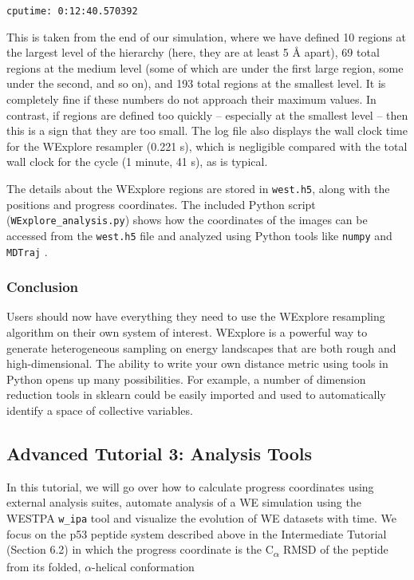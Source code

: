 \documentclass[9pt,tutorial,pubversion]{livecoms}
\begin{document}
\verb|cputime: 0:12:40.570392|

This is taken from the end of our simulation, where we have defined 10 regions at the largest level of the hierarchy (here, they are at least 5 \AA{} apart), 69 total regions at the medium level (some of which are under the first large region, some under the second, and so on), and 193 total regions at the smallest level. 
It is completely fine if these numbers do not approach their maximum values. 
In contrast, if regions are defined too quickly – especially at the smallest level – then this is a sign that they are too small.  
The log file also displays the wall clock time for the WExplore resampler (0.221 s), which is negligible compared with the total wall clock for the cycle (1 minute, 41 s), as is typical.

The details about the WExplore regions are stored in \verb|west.h5|, along with the positions and progress coordinates. 
The included Python script (\verb|WExplore_analysis.py|) shows how the coordinates of the images can be accessed from the \verb|west.h5| file and analyzed using Python tools like \verb|numpy| and \verb|MDTraj| \citep{mdt2015}.

\subsubsection{Conclusion}

Users should now have everything they need to use the WExplore resampling algorithm on their own system of interest.  
WExplore is a powerful way to generate heterogeneous sampling on energy landscapes that are both rough and high-dimensional. 
The ability to write your own distance metric using tools in Python opens up many possibilities. 
For example, a number of dimension reduction tools in sklearn could be easily imported and used to automatically identify a space of collective variables.  

\subsection{Advanced Tutorial 3: Analysis Tools}

In this tutorial, we will go over how to calculate progress coordinates using external analysis suites, automate analysis of a WE simulation using the WESTPA \verb|w_ipa| tool and visualize the evolution of WE datasets with time. 
We focus on the p53 peptide system described above in the Intermediate Tutorial (Section 6.2) in which the progress coordinate is the C\textsubscript{$\alpha$} RMSD of the peptide from its folded, $\alpha$-helical conformation
\end{document}
